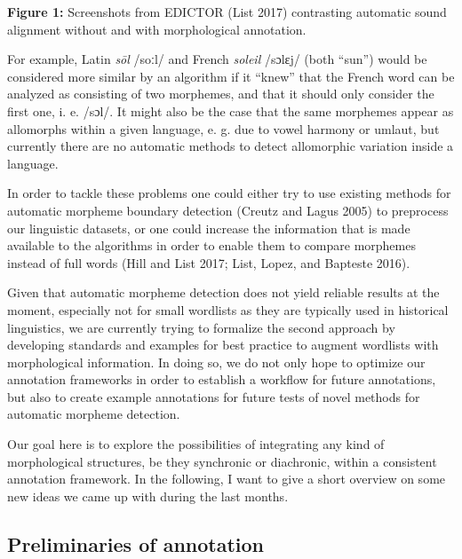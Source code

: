 \documentclass[
  english,
  a4paper,
  oneside,tablecaptionabove
]{scrbook}
\begin{document}
\textbf{Figure 1:} Screenshots from EDICTOR (List 2017) contrasting
automatic sound alignment without and with morphological annotation.

For example, Latin \emph{sōl} /soːl/ and French \emph{soleil} /sɔlɛj/
(both \enquote{sun}) would be considered more similar by an algorithm if
it \enquote{knew} that the French word can be analyzed as consisting of
two morphemes, and that it should only consider the first one, i. e.
/sɔl/. It might also be the case that the same morphemes appear as
allomorphs within a given language, e. g. due to vowel harmony or
umlaut, but currently there are no automatic methods to detect
allomorphic variation inside a language.

In order to tackle these problems one could either try to use existing
methods for automatic morpheme boundary detection (Creutz and Lagus
2005) to preprocess our linguistic datasets, or one could increase the
information that is made available to the algorithms in order to enable
them to compare morphemes instead of full words (Hill and List 2017;
List, Lopez, and Bapteste 2016).

Given that automatic morpheme detection does not yield reliable results
at the moment, especially not for small wordlists as they are typically
used in historical linguistics, we are currently trying to formalize the
second approach by developing standards and examples for best practice
to augment wordlists with morphological information. In doing so, we do
not only hope to optimize our annotation frameworks in order to
establish a workflow for future annotations, but also to create example
annotations for future tests of novel methods for automatic morpheme
detection.

Our goal here is to explore the possibilities of integrating any kind of
morphological structures, be they synchronic or diachronic, within a
consistent annotation framework. In the following, I want to give a
short overview on some new ideas we came up with during the last months.

\hypertarget{preliminaries-of-annotation}{%
\subsection{\texorpdfstring{{Preliminaries of
annotation}}{Preliminaries of annotation}}\label{preliminaries-of-annotation}}
\end{document}
